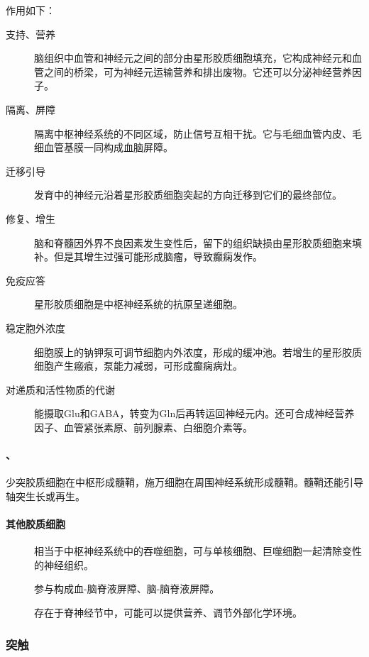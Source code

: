 作用如下：
\begin{description}
	\item[支持、营养] 脑组织中血管和神经元之间的部分由星形胶质细胞填充，它构成神经元和血管之间的桥梁，可为神经元运输营养和排出废物。它还可以分泌神经营养因子。
	\item[隔离、屏障] 隔离中枢神经系统的不同区域，防止信号互相干扰。它与毛细血管内皮、毛细血管基膜一同构成血脑屏障。
	\item[迁移引导] 发育中的神经元沿着星形胶质细胞突起的方向迁移到它们的最终部位。
	\item[修复、增生] 脑和脊髓因外界不良因素发生变性后，留下的组织缺损由星形胶质细胞来填补。但是其增生过强可能形成脑瘤，导致癫痫发作。
	\item[免疫应答] 星形胶质细胞是中枢神经系统的抗原呈递细胞。
	\item[稳定胞外浓度] 细胞膜上的钠钾泵可调节细胞内外浓度，形成的缓冲池。若增生的星形胶质细胞产生瘢痕，泵能力减弱，可形成癫痫病灶。
	\item[对递质和活性物质的代谢] 能摄取Glu和GABA，转变为Gln后再转运回神经元内。还可合成神经营养因子、血管紧张素原、前列腺素、白细胞介素等。
\end{description}

\paragraph{、}

少突胶质细胞在中枢形成髓鞘，施万细胞在周围神经系统形成髓鞘。髓鞘还能引导轴突生长或再生。

\paragraph{其他胶质细胞}

\begin{description}
	\item[] 相当于中枢神经系统中的吞噬细胞，可与单核细胞、巨噬细胞一起清除变性的神经组织。
	\item[] 参与构成血-脑脊液屏障、脑-脑脊液屏障。
	\item[] 存在于脊神经节中，可能可以提供营养、调节外部化学环境。
\end{description}

\subsubsection{突触}

